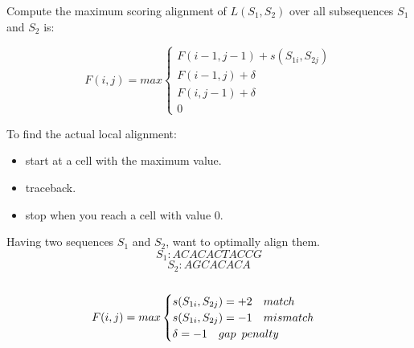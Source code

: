 \documentclass[11pt,a4paper]{report}
\begin{document}
Compute the maximum scoring alignment of $L(S_{1}, S_{2})$ over all subsequences $S_{1}$ and $S_{2}$ is:


\[ F(i,j)= max
\begin{cases}
   F(i-1,j-1) + s(S_{1i} , S_{2j})\\
   F(i-1 , j)+ \delta\\
   F(i,j-1)+ \delta\\
   0 \quad  
\end{cases}
\]

To find the actual local alignment:
\begin{itemize}
 \item start at a cell with the maximum value.
 \item traceback.
 \item stop when you reach a cell with value 0.
\end{itemize} 

Having two sequences  $S_{1}$ and $S_{2}$, want to optimally align them.
$$S_{1}:ACACACTACCG$$
$$S_{2}:AGCACACA$$\\

\[ F(i,j)= max
\begin{cases}
   s(S_{1i},S_{2j})= +2 \quad match \\
   s(S_{1i},S_{2j})= -1 \quad mismatch \\
  \delta = -1  \quad gap \enskip  penalty \\ 
\end{cases}
\] \\


 
  
\end{document}
